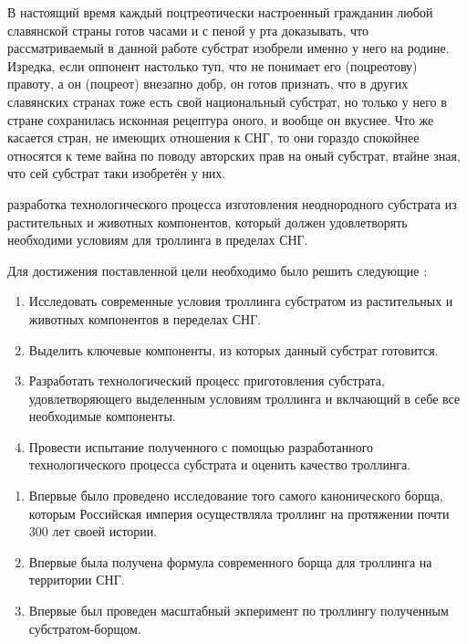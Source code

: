 
{\actuality} В настоящий время каждый поцтреотически настроенный гражданин любой славянской страны готов часами и с пеной у рта доказывать, что рассматриваемый в данной работе субстрат изобрели именно у него на родине. Изредка, если оппонент настолько туп, что не понимает его (поцреотову) правоту, а он (поцреот) внезапно добр, он готов признать, что в других славянских странах тоже есть свой национальный субстрат, но только у него в стране сохранилась исконная рецептура оного, и вообще он вкуснее.
Что же касается стран, не имеющих отношения к СНГ, то они гораздо спокойнее относятся к теме вайна по поводу авторских прав на оный субстрат, втайне зная, что сей субстрат таки изобретён у них.

{\aim} разработка технологического процесса изготовления неоднородного субстрата из растительных и животных компонентов, который должен удовлетворять необходими условиям для троллинга в пределах СНГ.

Для достижения поставленной цели необходимо было решить следующие {\tasks}:

\begin{enumerate}
  \item Исследовать современные условия троллинга субстратом из растительных и животных компонентов в переделах СНГ.
  \item Выделить ключевые компоненты, из которых данный субстрат готовится.
  \item Разработать технологический процесс приготовления субстрата, удовлетворяющего выделенным условиям троллинга и вклчающий в себе все необходимые компоненты.
  \item Провести испытание полученного с помощью разработанного технологического процесса субстрата и оценить качество троллинга.
\end{enumerate}


{\novelty}
\begin{enumerate}
  \item Впервые было проведено исследование того самого канонического борща, которым Российская империя осуществляла троллинг на протяжении почти 300 лет своей истории.
  \item Впервые была получена формула современного борща для троллинга на территории СНГ.
  \item Впервые был проведен масштабный экперимент по троллингу полученным субстратом-борщом.
\end{enumerate}

